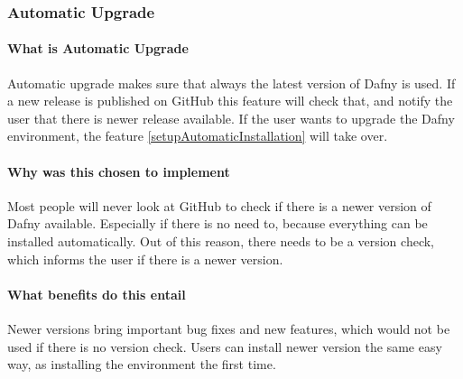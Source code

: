 \subsubsection{Automatic Upgrade} \label{setupAutomaticUpgrade}
\paragraph{What is Automatic Upgrade}
Automatic upgrade makes sure that always the latest version of Dafny is used. If a new release is published on GitHub this feature will check that, and notify the user that there is newer release available. If the user wants to upgrade the Dafny environment, the feature \ref{setupAutomaticInstallation} will take over. 
\paragraph{Why was this chosen to implement}
Most people will never look at GitHub to check if there is a newer version of Dafny available. Especially if there is no need to, because everything can be installed automatically. Out of this reason, there needs to be a version check, which informs the user if there is a newer version. 
\paragraph{What benefits do this entail}
Newer versions bring important bug fixes and new features, which would not be used if there is no version check. Users can install newer version the same easy way, as installing the environment the first time.  
